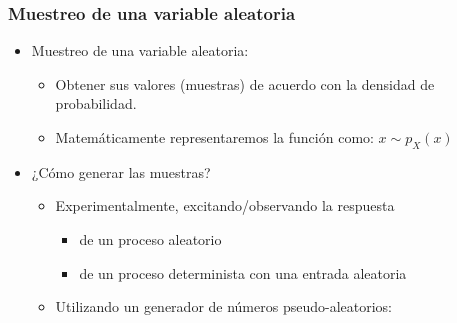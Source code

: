 \documentclass{beamer}
\numberwithin{section}{part}
\begin{document}
% 
% 
% 
% 


\begin{frame}
  \frametitle{Muestreo de una variable aleatoria}
  
  \footnotesize
  
  \begin{itemize}
    \item \alert{Muestreo de una variable aleatoria:}
    \begin{itemize}\scriptsize
      \item Obtener sus valores (muestras) de acuerdo con la densidad de probabilidad.
      \item Matemáticamente representaremos la función como: \color{olivegreen}$x \sim p_X(x)$\color{black}
    \end{itemize}  
    \item \alert{¿Cómo generar las muestras?}
    \begin{itemize}\scriptsize
      \item  Experimentalmente, excitando/observando la respuesta 
      \begin{itemize}\scriptsize
        \item de un proceso aleatorio 
        \item de un proceso determinista con una entrada aleatoria
      \end{itemize}
      \item Utilizando un generador de números pseudo-aleatorios:
  

\end{itemize}
\end{itemize}
\end{frame}
\end{document}
